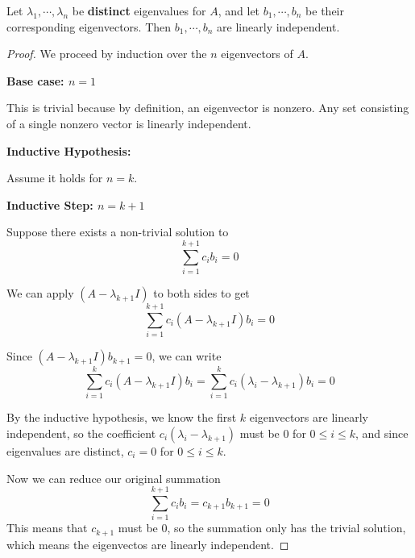 \begin{theorem}
Let $\lambda_{1}, \cdots, \lambda_{n}$ be \textbf{distinct} eigenvalues for $A$, and let $b_{1}, \cdots, b_{n}$ be their corresponding eigenvectors. Then $b_{1}, \cdots, b_{n}$ are linearly independent. 
\end{theorem}

\begin{proof}
We proceed by induction over the $n$ eigenvectors of $A$. 

\textbf{Base case: $n = 1$}

This is trivial because by definition, an eigenvector is nonzero. Any set consisting of a single nonzero vector is linearly independent.

\textbf{Inductive Hypothesis:}

Assume it holds for $n = k$. 

\textbf{Inductive Step: $n = k + 1$}

Suppose there exists a non-trivial solution to 
$$ \sum_{i = 1}^{k + 1} c_{i} b_{i} = 0$$

We can apply $(A - \lambda_{k + 1} I)$ to both sides to get 
$$ \sum_{i = 1}^{k + 1} c_{i} (A - \lambda_{k + 1} I) b_{i} = 0$$

Since $(A - \lambda_{k + 1}I) b_{k + 1} = 0$, we can write 
$$\sum_{i = 1}^{k} c_{i} (A - \lambda_{k + 1} I ) b_{i} = \sum_{i = 1}^{k} c_{i} (\lambda_{i} - \lambda_{k + 1} ) b_{i} = 0$$ 

By the inductive hypothesis, we know the first $k$ eigenvectors are linearly independent, so the coefficient $c_{i} (\lambda_{i} - \lambda_{k + 1} )$ must be 0 for $0 \leq i \leq k$, and since eigenvalues are distinct, $c_{i} = 0$ for $0 \leq i \leq k$. 

Now we can reduce our original summation 
$$\sum_{i = 1}^{k+1} c_{i} b_{i} = c_{k+1} b_{k+1} = 0$$
This means that $c_{k+1}$ must be 0, so the summation only has the trivial solution, which means the eigenvectos are linearly independent. 
\end{proof}